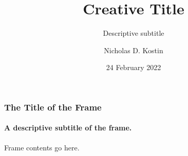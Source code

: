 \documentclass{beamer}
\title{Creative Title}
\subtitle{Descriptive subtitle}
\author{Nicholas D. Kostin}
\date{24 February 2022}
\begin{document}
\frame{\titlepage}

\begin{frame}
\frametitle{The Title of the Frame}
\framesubtitle{A descriptive subtitle of the frame.}

Frame contents go here.

\end{frame}
\end{document}
